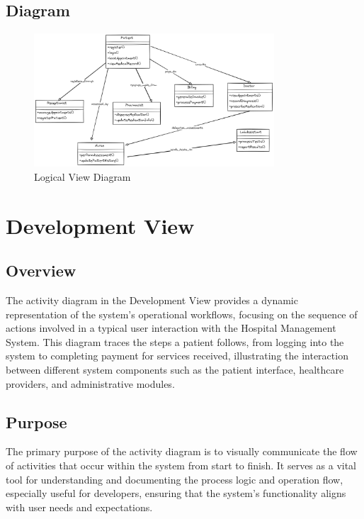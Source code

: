 \documentclass[12pt]{article}
\begin{document}
\subsection*{Diagram}
\begin{figure}[h!]
\centering
\includegraphics[width=0.8\textwidth]{Logicalview.png}
\caption{Logical View Diagram}
\end{figure}


\newpage


\section*{Development View}
\subsection*{Overview}
The activity diagram in the Development View provides a dynamic representation of the system’s operational workflows, focusing on the sequence of actions involved in a typical user interaction with the Hospital Management System. This diagram traces the steps a patient follows, from logging into the system to completing payment for services received, illustrating the interaction between different system components such as the patient interface, healthcare providers, and administrative modules.

\subsection*{Purpose}
The primary purpose of the activity diagram is to visually communicate the flow of activities that occur within the system from start to finish. It serves as a vital tool for understanding and documenting the process logic and operation flow, especially useful for developers, ensuring that the system’s functionality aligns with user needs and expectations.
\end{document}
